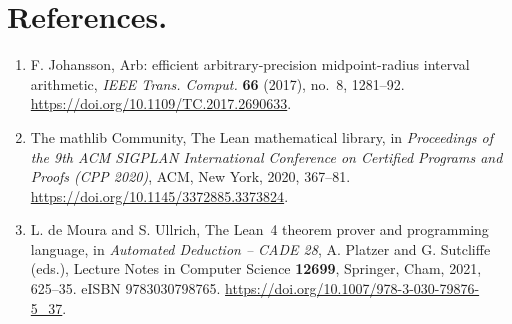 \documentclass[11pt,a4paper]{article}
\newcommand{\WholeURL}[1]{\hfil\penalty200\hfilneg\mbox{\url{#1}}}
\begin{document}
\section*{References.}
\begin{enumerate}\setlength{\itemsep}{1pt}
\item[{[1]}] F. Johansson, Arb: efficient arbitrary-precision midpoint-radius interval arithmetic, \emph{IEEE Trans. Comput.} \textbf{66} (2017), no.~8, 1281--92. \WholeURL{https://doi.org/10.1109/TC.2017.2690633}.
\item[{[2]}] The mathlib Community, The Lean mathematical library, in \emph{Proceedings of the 9th ACM SIGPLAN International Conference on Certified Programs and Proofs (CPP 2020)}, ACM, New York, 2020, 367--81. \WholeURL{https://doi.org/10.1145/3372885.3373824}.
\item[{[3]}] L. de Moura and S. Ullrich, The Lean~4 theorem prover and programming language, in \emph{Automated Deduction -- CADE 28}, A. Platzer and G. Sutcliffe (eds.), Lecture Notes in Computer Science \textbf{12699}, Springer, Cham, 2021, 625--35. eISBN 9783030798765. \WholeURL{https://doi.org/10.1007/978-3-030-79876-5_37}.
\end{enumerate}
\end{document}
